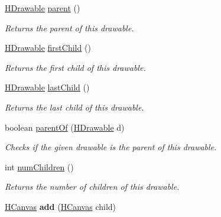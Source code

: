 \begin{DoxyCompactItemize}
\item 
\hyperlink{classhype_1_1core_1_1drawable_1_1_h_drawable}{H\-Drawable} \hyperlink{classhype_1_1core_1_1drawable_1_1_h_drawable_ae3e39365ae4a4efd3c1540bd428a630c}{parent} ()
\begin{DoxyCompactList}\small\item\em Returns the parent of this drawable. \end{DoxyCompactList}\item 
\hyperlink{classhype_1_1core_1_1drawable_1_1_h_drawable}{H\-Drawable} \hyperlink{classhype_1_1core_1_1drawable_1_1_h_drawable_a30494a50fd2a78b74994c93bef961d8c}{first\-Child} ()
\begin{DoxyCompactList}\small\item\em Returns the first child of this drawable. \end{DoxyCompactList}\item 
\hyperlink{classhype_1_1core_1_1drawable_1_1_h_drawable}{H\-Drawable} \hyperlink{classhype_1_1core_1_1drawable_1_1_h_drawable_a2fcc779fd97b24ef039c92cbc606717f}{last\-Child} ()
\begin{DoxyCompactList}\small\item\em Returns the last child of this drawable. \end{DoxyCompactList}\item 
boolean \hyperlink{classhype_1_1core_1_1drawable_1_1_h_drawable_ae833b7b6fb4a91bca96bfc122aba3010}{parent\-Of} (\hyperlink{classhype_1_1core_1_1drawable_1_1_h_drawable}{H\-Drawable} d)
\begin{DoxyCompactList}\small\item\em Checks if the given drawable is the parent of this drawable. \end{DoxyCompactList}\item 
int \hyperlink{classhype_1_1core_1_1drawable_1_1_h_drawable_a85a4ab0860a8c22e7f66d3da99f06940}{num\-Children} ()
\begin{DoxyCompactList}\small\item\em Returns the number of children of this drawable. \end{DoxyCompactList}\item 
\hypertarget{classhype_1_1core_1_1drawable_1_1_h_drawable_a337e3f8fcdad9f46f0b86f195d4a6c9f}{\hyperlink{classhype_1_1extended_1_1drawable_1_1_h_canvas}{H\-Canvas} {\bfseries add} (\hyperlink{classhype_1_1extended_1_1drawable_1_1_h_canvas}{H\-Canvas} child)}\label{classhype_1_1core_1_1drawable_1_1_h_drawable_a337e3f8fcdad9f46f0b86f195d4a6c9f}


\end{DoxyCompactItemize}
